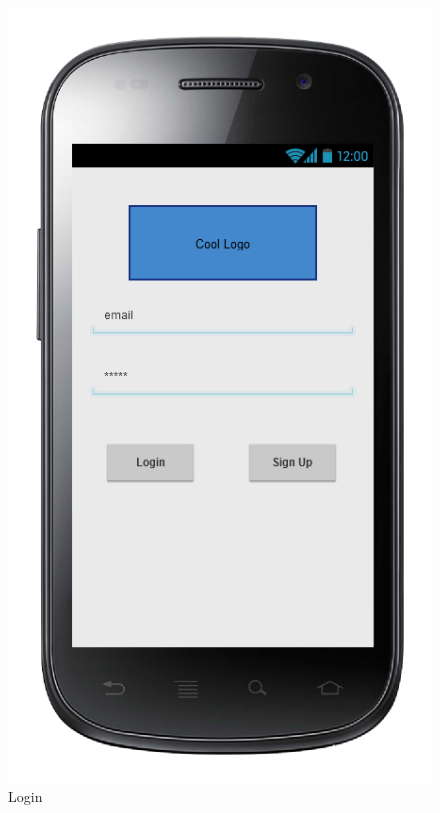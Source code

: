 
\begin{figure} [h]
\centering
  	  \includegraphics[scale=0.5]{ui/sequencelogin.png}
\caption{Login}
  
	\end{figure}
